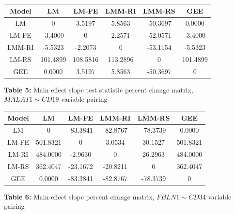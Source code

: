 \documentclass[12pt,]{article}
\begin{document}
\vspace{20pt}

\begin{center}
\begin{tabular}{|c||c|c|c|c|c|}
\hline
Model & LM & LM-FE & LMM-RI & LMM-RS & GEE \\
\hline
\hline
LM & 0  & 3.5197   & 5.8563    & \cellcolor{red!25} -50.3697  & \cellcolor{green!25} 0.0000 \\
\hline
LM-FE & -3.4000  & 0   &  \cellcolor{orange!25} 2.2571    & \cellcolor{red!25} -52.0571  & -3.4000 \\
\hline
LMM-RI & -5.5323  &  \cellcolor{orange!25} -2.2073  & 0    & \cellcolor{red!25} -53.1154  & -5.5323  \\
\hline
LM-RS & \cellcolor{blue!25} 101.4899 & \cellcolor{blue!25} 108.5816 & \cellcolor{blue!25} 113.2896  & 0    & \cellcolor{blue!25} 101.4899 \\
\hline
GEE & \cellcolor{green!25} 0.0000  & 3.5197   & 5.8563    & \cellcolor{red!25} -50.3697  & 0 \\
\hline
\end{tabular}

\vspace{5pt}

\textbf{Table 5:} Main effect slope test statistic percent change matrix, $MALAT1 \sim CD19$ variable pairing
\end{center}

\vspace{20pt}

\begin{center}
\begin{tabular}{|c||c|c|c|c|c|}
\hline
Model & LM & LM-FE & LMM-RI & LMM-RS & GEE \\
\hline
\hline
LM & 0   & -83.3841 & -82.8767  & \cellcolor{red!25} -78.3739 & \cellcolor{green!25} 0.0000  \\
\hline
LM-FE & 501.8321 & 0   &  \cellcolor{orange!25} 3.0534    & \cellcolor{red!25} 30.1527  & 501.8321 \\
\hline
LM-RI & 484.0000 &  \cellcolor{orange!25} -2.9630  & 0    & \cellcolor{red!25} 26.2963  & 484.0000  \\
\hline
LM-RS & \cellcolor{blue!25} 362.4047 & \cellcolor{blue!25} -23.1672 & \cellcolor{blue!25} -20.8211  & 0   & \cellcolor{blue!25} 362.4047  \\
\hline
GEE & \cellcolor{green!25} 0.0000   & -83.3841 & -82.8767  &\cellcolor{red!25}  -78.3739 & 0  \\
\hline
\end{tabular}

\vspace{5pt}

\textbf{Table 6:} Main effect slope percent change matrix, $FBLN1 \sim CD34$ variable pairing
\end{center}
\end{document}
